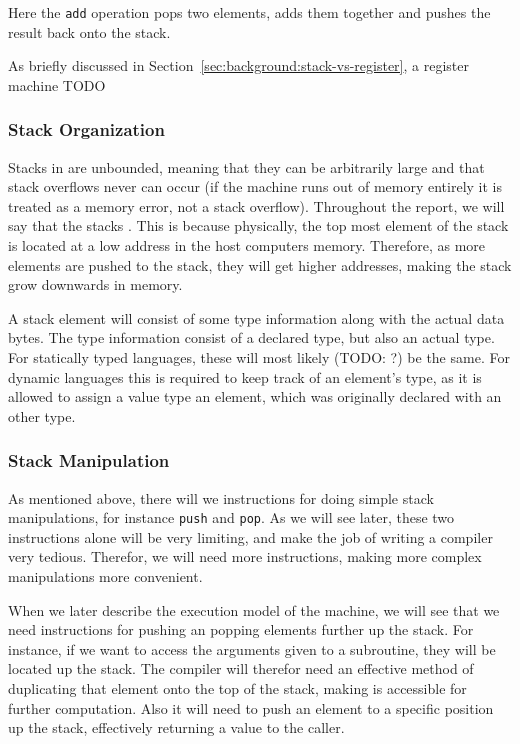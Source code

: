 Here the {\tt add} operation pops two elements, adds them together and pushes
the result back onto the stack.

As briefly discussed in Section~\ref{sec:background:stack-vs-register}, a
register machine TODO

\subsubsection{Stack Organization}

Stacks in \thename{} are unbounded, meaning that they can be arbitrarily large
and that stack overflows never can occur (if the machine runs out of memory
entirely it is treated as a memory error, not a stack overflow). Throughout the
report, we will say that the stacks . This is because
physically, the top most element of the stack is located at a low address in the
host computers memory. Therefore, as more elements are pushed to the stack, they
will get higher addresses, making the stack grow downwards in memory.

A stack element will consist of some type information along with the actual data
bytes. The type information consist of a declared type, but also an actual
type. For statically typed languages, these will most likely (TODO: ?) be the
same. For dynamic languages this is required to keep track of an element's type,
as it is allowed to assign a value type an element, which was originally
declared with an other type.

\subsubsection{Stack Manipulation}
As mentioned above, there will we instructions for doing simple stack
manipulations, for instance {\tt push} and {\tt pop}. As we will see later,
these two instructions alone will be very limiting, and make the job of writing
a compiler very tedious. Therefor, we will need more instructions, making more
complex manipulations more convenient.

When we later describe the execution model of the machine, we will see that we
need instructions for pushing an popping elements further up the stack. For
instance, if we want to access the arguments given to a subroutine, they will be
located up the stack. The compiler will therefor need an effective method of
duplicating that element onto the top of the stack, making is accessible for
further computation. Also it will need to push an element to a specific position
up the stack, effectively returning a value to the caller.

